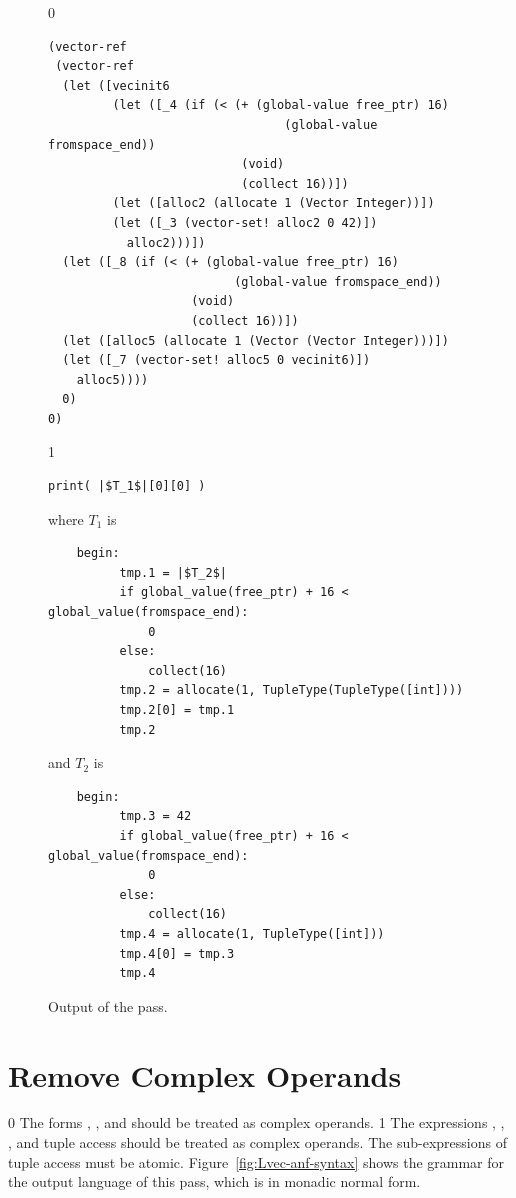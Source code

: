 \documentclass[7x10]{TimesAPriori_MIT}%
\def\racketEd{0}
\def\pythonEd{1}
\def\edition{0}
\numberwithin{theorem}{chapter}
\numberwithin{definition}{chapter}
\numberwithin{equation}{chapter}
\begin{document}
\begin{figure}[tbp]
  \begin{tcolorbox}[colback=white]
{\if\edition\racketEd
\begin{lstlisting}
(vector-ref
 (vector-ref
  (let ([vecinit6
         (let ([_4 (if (< (+ (global-value free_ptr) 16)
                                 (global-value fromspace_end))
                           (void)
                           (collect 16))])
         (let ([alloc2 (allocate 1 (Vector Integer))])
         (let ([_3 (vector-set! alloc2 0 42)])
           alloc2)))])
  (let ([_8 (if (< (+ (global-value free_ptr) 16)
                          (global-value fromspace_end))
                    (void)
                    (collect 16))])
  (let ([alloc5 (allocate 1 (Vector (Vector Integer)))])
  (let ([_7 (vector-set! alloc5 0 vecinit6)])
    alloc5))))
  0)
0)
\end{lstlisting}
\fi}
{\if\edition\pythonEd
\begin{lstlisting}
print( |$T_1$|[0][0] )
\end{lstlisting}
where $T_1$ is
\begin{lstlisting}
    begin:
          tmp.1 = |$T_2$|
          if global_value(free_ptr) + 16 < global_value(fromspace_end):
              0
          else:
              collect(16)
          tmp.2 = allocate(1, TupleType(TupleType([int])))
          tmp.2[0] = tmp.1
          tmp.2
\end{lstlisting}
and $T_2$ is
\begin{lstlisting}
    begin:
          tmp.3 = 42
          if global_value(free_ptr) + 16 < global_value(fromspace_end):
              0
          else:
              collect(16)
          tmp.4 = allocate(1, TupleType([int]))
          tmp.4[0] = tmp.3
          tmp.4
\end{lstlisting}
\fi}
  \end{tcolorbox}
\caption{Output of the  pass.}
\label{fig:expose-alloc-output}
\end{figure}


\section{Remove Complex Operands}
\label{sec:remove-complex-opera-Lvec}

{\if\edition\racketEd
%
The forms , , and 
should be treated as complex operands.
%
\fi}
%
{\if\edition\pythonEd
%
The expressions , , ,
and tuple access should be treated as complex operands.  The
sub-expressions of tuple access must be atomic.
%
\fi}
Figure~\ref{fig:Lvec-anf-syntax}
shows the grammar for the output language \LangAllocANF{} of this
pass, which is \LangAlloc{} in monadic normal form.
\end{document}
